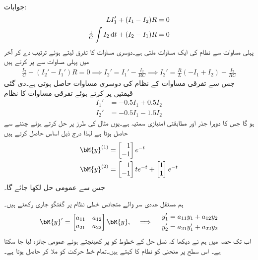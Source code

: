جوابات:
\begin{align*}
LI_1'+(I_1-I_2)R&=0\\
\tfrac{1}{C}\int I_2 \dif t+(I_2-I_1)R&=0
\end{align*}
پہلی مساوات سے نظام کی ایک مساوات  ملتی ہے۔دوسری مساوات کا تفرق لیتے ہوئے ترتیب دے کر آخر میں پہلی مساوات سے  پر کرتے ہیں
\begin{align*}
\frac{I_2}{C}+(I_2'-I_1')R=0 \implies I_2'=I_1'-\frac{I_2}{RC} \implies  I_2'=\frac{R}{L}(-I_1+I_2)-\frac{I_2}{RC}
\end{align*}
جس سے تفرقی مساوات کے نظام کی دوسری مساوات  حاصل ہوتی ہے۔دی گئی قیمتیں پر کرتے ہوئے تفرقی مساوات کا نظام 
\begin{align*}
I_1'&=-0.5I_1+0.5I_2\\
I_2'&=-0.5I_1-1.5I_2
\end{align*}
ہو گا جس کا دوہرا جذر  اور مطابقتی امتیازی سمتیہ  ہے۔یوں مثال  کی طرز پر  حل کرتے ہوئے  چننے سے  حاصل ہوتا ہے لہٰذا درج ذیل اساس حاصل کرتے ہیں
\begin{align*}
\bM{y}^{(1)}&=\begin{bmatrix*}[r] 1\\ -1 \end{bmatrix*} e^{-t}\\
\bM{y}^{(2)}&=\begin{bmatrix*}[r] 1\\ -1 \end{bmatrix*} te^{-t}+\begin{bmatrix} 1\\1 \end{bmatrix}e^{-t}
\end{align*}
جس سے  عمومی حل  لکھا جائے گا۔

ہم مستقل عددی سر والے متجانس خطی نظام  پر گفتگو جاری رکھتے ہیں۔
\begin{gather}\label{مساوات_نظام_جانچ_نقطہ_فاصل_الف}
\begin{aligned}
\bM{y}'=\begin{bmatrix} a_{11} & a_{12} \\ a_{21} & a_{22} \end{bmatrix} \bM{y}
\end{aligned}, \quad \implies \quad 
\begin{aligned}
y_1'&=a_{11}y_1+a_{12}y_2\\
y_2'&=a_{21}y_1'+a_{22}y_2
\end{aligned}
\end{gather}
اب تک  حصہ  میں ہم نے دیکھا کہ نسل حل  کے خطوط کو   پر کھینچتے ہوئے عمومی جائزہ لیا جا سکتا ہے۔ اس سطح پر منحنی کو نظام  کا  کہتے ہیں۔تمام خط حرکت کو ملا کر  حاصل ہوتا ہے۔

